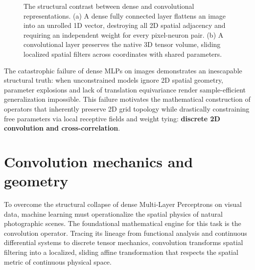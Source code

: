 \begin{figure}[H]
\begin{minipage}{0.48\linewidth}
\end{minipage}
\caption{The structural contrast between dense and convolutional representations. (a) A dense fully connected layer flattens an image into an unrolled 1D vector, destroying all 2D spatial adjacency and requiring an independent weight for every pixel-neuron pair. (b) A convolutional layer preserves the native 3D tensor volume, sliding localized spatial filters across coordinates with shared parameters.}
\label{fig:dense_vs_conv_geometry}
\end{figure}

The catastrophic failure of dense MLPs on images demonstrates an inescapable structural truth: when unconstrained models ignore 2D spatial geometry, parameter explosions and lack of translation equivariance render sample-efficient generalization impossible. This failure motivates the mathematical construction of operators that inherently preserve 2D grid topology while drastically constraining free parameters via local receptive fields and weight tying: \textbf{discrete 2D convolution and cross-correlation}.


\section{Convolution mechanics and geometry}
\label{sec:cnn_mechanics_and_geometry}

To overcome the structural collapse of dense Multi-Layer Perceptrons on visual data, machine learning must operationalize the spatial physics of natural photographic scenes. The foundational mathematical engine for this task is the convolution operator. Tracing its lineage from functional analysis and continuous differential systems to discrete tensor mechanics, convolution transforms spatial filtering into a localized, sliding affine transformation that respects the spatial metric of continuous physical space.

